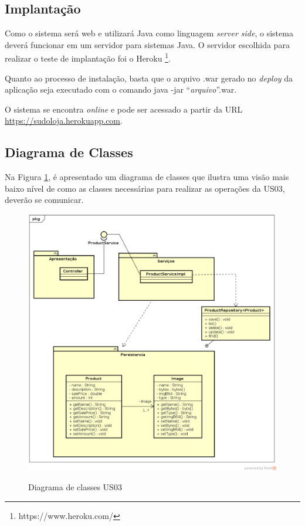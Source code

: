 \documentclass[a4paper,12pt]{monografia}
\begin{document}
\subsection{Implantação} %
\label{sub:o_que_deve_ser_produzido}

Como o sistema será web e utilizará Java como linguagem \textit{server side}, o sistema deverá funcionar em um servidor para sistemas  Java. O servidor escolhida para realizar o teste de implantação foi o Heroku \footnote{https://www.heroku.com/}.

Quanto ao processo de instalação, basta que o arquivo .war gerado no \textit{deploy} da aplicação seja executado com o comando java -jar ``\textit{arquivo}''.war.

O sistema se encontra \textit{online} e pode ser acessado a partir da URL \url{https://sudoloja.herokuapp.com}.



\subsection{Diagrama de Classes} %
\label{sec:diagrama_de_classes}

Na Figura \ref{fig:diagrama-classe-estoque}, é apresentado um diagrama de classes que ilustra uma visão mais baixo nível de como as classes necessárias para realizar as operações da US03, deverão se comunicar. 

\begin{figure}[H]
\centering
\caption{Diagrama de classes US03}
\centering
\includegraphics[width=15cm]{img/diagramas/class-diagram-estoque.eps}\\
\label{fig:diagrama-classe-estoque}
\end{figure}
\end{document}
